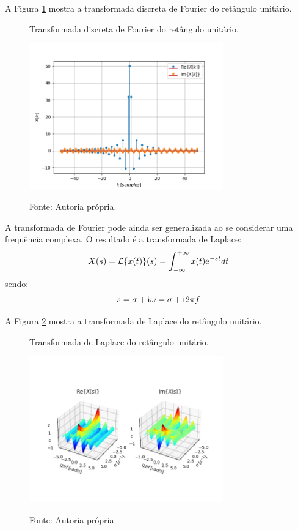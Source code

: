 \documentclass[12pt,a4paper]{report}
\newcommand{\I}{{\mathrm{i}\mkern1mu}}
\newcommand{\euler}{{\mathrm{e}\mkern1mu}}
\begin{document}
  A Figura \ref{fig:discrete_fourier_transform} mostra a transformada discreta de Fourier do retângulo unitário.
  \begin{figure}[H]
    \caption{Transformada discreta de Fourier do retângulo unitário.}
    \centering
    \includegraphics[width=0.75\textwidth]{discrete_fourier_transform}
    \label{fig:discrete_fourier_transform}
    \caption*{Fonte: Autoria própria.}
  \end{figure}

  A transformada de Fourier pode ainda ser generalizada ao se considerar uma frequência complexa. O resultado
  é a transformada de Laplace:
  \begin{equation}
    X(s) = \mathcal{L}\{x(t)\}(s) = \int_{-\infty}^{+\infty} x(t) \euler^{-s t} dt
  \end{equation}
  sendo: 
  \begin{equation}
    s = \sigma + \I \omega = \sigma + \I 2 \pi f
  \end{equation}

  A Figura \ref{fig:laplace_transform} mostra a transformada de Laplace do retângulo unitário.
  \begin{figure}[H]
    \caption{Transformada de Laplace do retângulo unitário.}
    \centering
    \includegraphics[width=0.75\textwidth]{laplace_transform}
    \label{fig:laplace_transform}
    \caption*{Fonte: Autoria própria.}
  \end{figure}
\end{document}
